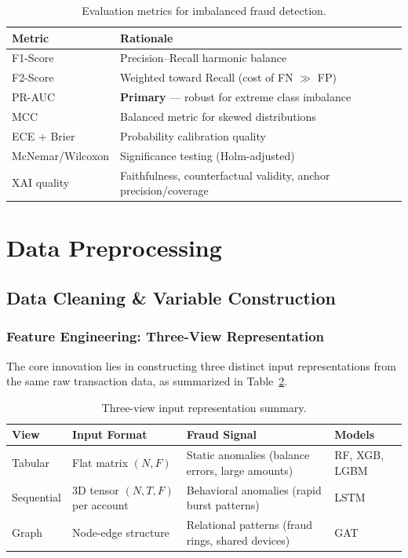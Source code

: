 \documentclass[10pt,a4paper,twocolumn]{article}
\begin{document}
\begin{table}[H]
\centering
\caption{Evaluation metrics for imbalanced fraud detection.}
\label{tab:metrics}
{\small
\begin{tabularx}{\columnwidth}{lX}
\toprule
\textbf{Metric} & \textbf{Rationale} \\
\midrule
F1-Score & Precision--Recall harmonic balance \\
F2-Score & Weighted toward Recall (cost of FN $\gg$ FP) \\
PR-AUC & \textbf{Primary} --- robust for extreme class imbalance \\
MCC & Balanced metric for skewed distributions \\
ECE + Brier & Probability calibration quality \\
McNemar/Wilcoxon & Significance testing (Holm-adjusted) \\
XAI quality & Faithfulness, counterfactual validity, anchor precision/coverage \\
\bottomrule
\end{tabularx}
}
\end{table}


\section{Data Preprocessing}


\subsection{Data Cleaning \& Variable Construction}

\subsubsection{Feature Engineering: Three-View Representation}

The core innovation lies in constructing three distinct input representations from the same raw transaction data, as summarized in Table~\ref{tab:views}.

\begin{table}[H]
\centering
\caption{Three-view input representation summary.}
\label{tab:views}
{\small
\begin{tabularx}{\columnwidth}{@{}lXll@{}}
\toprule
\textbf{View} & \textbf{Input Format} & \textbf{Fraud Signal} & \textbf{Models} \\
\midrule
Tabular & Flat matrix $(N, F)$ & Static anomalies (balance errors, large amounts) & RF, XGB, LGBM \\
Sequential & 3D tensor $(N, T, F)$ per account & Behavioral anomalies (rapid burst patterns) & LSTM \\
Graph & Node-edge structure & Relational patterns (fraud rings, shared devices) & GAT \\
\bottomrule
\end{tabularx}
}
\end{table}
\end{document}
